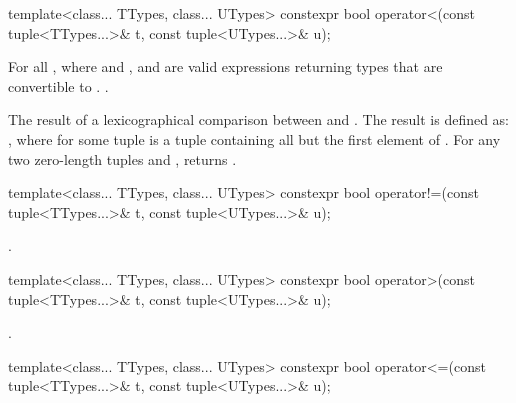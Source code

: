 %
%
\begin{itemdecl}
template<class... TTypes, class... UTypes>
  constexpr bool operator<(const tuple<TTypes...>& t, const tuple<UTypes...>& u);
\end{itemdecl}

\begin{itemdescr}
\pnum
\requires  For all ,
where  and
, 
and 
are valid expressions returning types that are
convertible to .
 \tcode{==}
.

\pnum\returns  The result of a lexicographical comparison
between  and . The result is defined
as: , where  for some
tuple  is a tuple containing all but the first element
of .  For any two zero-length tuples 
and ,  returns .
\end{itemdescr}

%
%
\begin{itemdecl}
template<class... TTypes, class... UTypes>
  constexpr bool operator!=(const tuple<TTypes...>& t, const tuple<UTypes...>& u);
\end{itemdecl}
\begin{itemdescr}
\pnum\returns {}.
\end{itemdescr}

%
%
\begin{itemdecl}
template<class... TTypes, class... UTypes>
  constexpr bool operator>(const tuple<TTypes...>& t, const tuple<UTypes...>& u);
\end{itemdecl}
\begin{itemdescr}
\pnum\returns {}.
\end{itemdescr}

%
%
\begin{itemdecl}
template<class... TTypes, class... UTypes>
  constexpr bool operator<=(const tuple<TTypes...>& t, const tuple<UTypes...>& u);
\end{itemdecl}
\begin{itemdescr}
\pnum\returns {}
\end{itemdescr}

